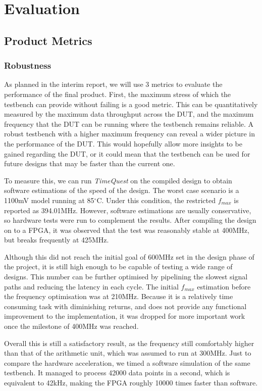 \chapter{Evaluation}

\section{Product Metrics}
\subsection{Robustness}
As planned in the interim report, we will use 3 metrics to evaluate the performance of the final product.
First, the maximum stress of which the testbench can provide without failing is a good metric.
This can be quantitatively measured by the maximum data throughput across the DUT, and the maximum frequency that the DUT can be running where the testbench remains reliable.
A robust testbench with a higher maximum frequency can reveal a wider picture in the performance of the DUT.
This would hopefully allow more insights to be gained regarding the DUT, or it could mean that the testbench can be used for future designs that may be faster than the current one.

To measure this, we can run \textit{TimeQuest} on the compiled design to obtain software estimations of the speed of the design.
The worst case scenario is a 1100mV model running at 85$^\circ$C.
Under this condition, the restricted $f_{max}$ is reported as 394.01MHz.
However, software estimations are usually conservative, so hardware tests were run to complement the results.
After compiling the design on to a FPGA, it was observed that the test was reasonably stable at 400MHz, but breaks frequently at 425MHz.

Although this did not reach the initial goal of 600MHz set in the design phase of the project, it is still high enough to be capable of testing a wide range of designs.
This number can be further optimised by pipelining the slowest signal paths and reducing the latency in each cycle.
The initial $f_{max}$ estimation before the frequency optimisation was at 210MHz.
Because it is a relatively time consuming task with diminishing returns, and does not provide any functional improvement to the implementation, it was dropped for more important work once the milestone of 400MHz was reached.

Overall this is still a satisfactory result, as the frequency still comfortably higher than that of the arithmetic unit, which was assumed to run at 300MHz.
Just to compare the hardware acceleration, we timed a software simulation of the same testbench.
It managed to process 42000 data points in a second, which is equivalent to 42kHz, making the FPGA roughly 10000 times faster than software.

